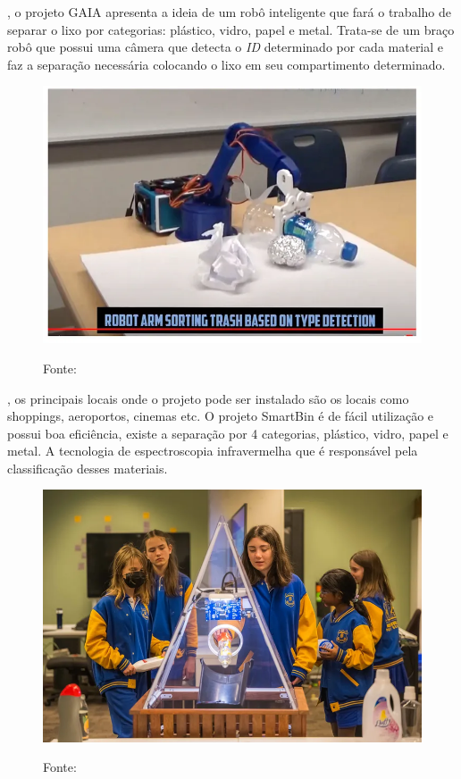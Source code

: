 \cite{gaia}, o projeto GAIA apresenta a ideia de um robô inteligente que fará o trabalho de separar o lixo por categorias: plástico, vidro, papel e metal. Trata-se de um braço robô que possui uma câmera que detecta o \textit{ID} determinado por cada material e faz a separação necessária colocando o lixo em seu compartimento determinado.

 \begin{figure}[H]
    \label{fig:gaia}
    \begin{center}
        
        \includegraphics[scale=0.5]{Textuais/imagens/gaia.png}
        
        Fonte: \cite{gaia}
    \end{center}
\end{figure}

\cite{smartbin},  os principais locais onde o projeto pode ser instalado são os locais como shoppings, aeroportos, cinemas etc.  O projeto SmartBin é de fácil utilização e possui boa eficiência, existe a separação por 4 categorias, plástico, vidro, papel e metal. A tecnologia de espectroscopia infravermelha que é responsável pela classificação desses materiais.

 \begin{figure}[H]
    
    \label{fig:smartbin}
    \begin{center}
        
        \includegraphics[scale=0.5]{Textuais/imagens/smart.png}
        
        Fonte: \cite{smartbin}
    \end{center}
\end{figure}



